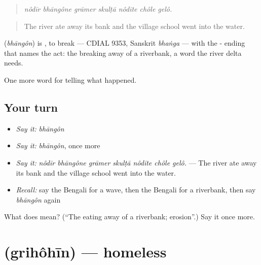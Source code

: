 \begin{quote}
      
\end{quote}

\begin{quote}
\emph{nôdīr bhāngône grāmer skulṭā nôdīte chôle gelô.}
\end{quote}

\begin{quote}
The river ate away its bank and the village school went into the water.
\end{quote}

\begin{cousinweb}
\textbf{} (\emph{bhāngôn}) is \textbf{}, to break — CDIAL 9353, Sanskrit \emph{bhaṅga} — with the - ending that names the act: the breaking away of a riverbank, a word the river delta needs.
\end{cousinweb}

\begin{grammarlens}[title={What you've built}]
One more word for telling what happened.
\end{grammarlens}

\subsection*{Your turn}
\begin{itemize}
\raggedright
  \item \emph{Say it:} \emph{bhāngôn}
  \item \emph{Say it:} \emph{bhāngôn}, once more
  \item \emph{Say it:} \emph{nôdīr bhāngône grāmer skulṭā nôdīte chôle gelô.} — The river ate away its bank and the village school went into the water.
  \item \emph{Recall:} say the Bengali for a wave, then the Bengali for a riverbank, then say \emph{bhāngôn} again
\end{itemize}

\begin{tcolorbox}[breakable,colback=teal!4,colframe=teal!35!black,title={Before you move on}]
What does  mean? (\textquotedblleft{}The eating away of a riverbank; erosion\textquotedblright{}.) Say it once more.
\end{tcolorbox}
\section[\texorpdfstring{\bn{গৃহহীন} (grihôhīn)}{গৃহহীন (grihôhīn)}]{ (grihôhīn) — homeless}

